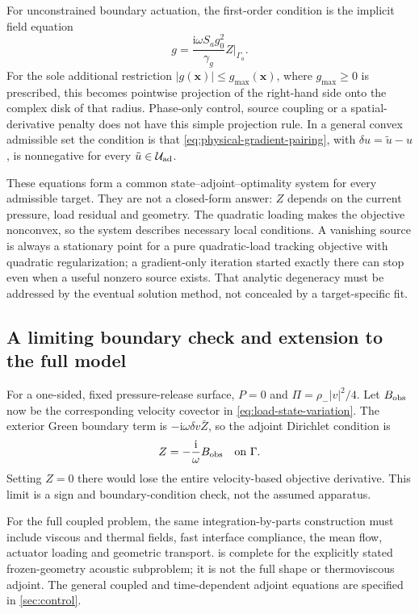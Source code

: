For unconstrained boundary actuation, the first-order condition is the
implicit field equation
\begin{equation}
 g=\frac{\mathrm i\omega S_ag_0^2}{\gamma_g}Z|_{\Gamma_a}.
 \label{eq:boundary-source-optimality}
\end{equation}
For the sole additional restriction $|g(\bm x)|\leq g_{\max}(\bm x)$,
where $g_{\max}\geq0$ is prescribed, this becomes pointwise projection of
the right-hand side onto the complex disk of that radius. Phase-only control,
source coupling or a spatial-derivative penalty does not have this simple
projection rule. In a general convex admissible set the condition is that
\cref{eq:physical-gradient-pairing}, with $\delta u=\tilde u-u$, is
nonnegative for every $\tilde u\in\mathcal U_{\rm ad}$.

These equations form a common state--adjoint--optimality system for every
admissible target. They are not a closed-form answer: $Z$ depends on the
current pressure, load residual and geometry. The quadratic loading makes
the objective nonconvex, so the system describes necessary local conditions.
A vanishing source is always a stationary point for a pure quadratic-load
tracking objective with quadratic regularization; a gradient-only iteration
started exactly there can stop even when a useful nonzero source exists.
That analytic degeneracy must be addressed by the eventual solution method,
not concealed by a target-specific fit.

\subsection{A limiting boundary check and extension to the full model}
For a one-sided, fixed pressure-release surface, $P=0$ and
$\Pi=\rho_-|v|^2/4$. Let $B_{\rm obs}$ now be the corresponding velocity
covector in \cref{eq:load-state-variation}. The exterior Green boundary term
is $-\mathrm i\omega\delta v\bar Z$, so the adjoint Dirichlet condition is
\begin{equation}
 Z=-\frac{\mathrm i}{\omega}B_{\rm obs}\quad\text{on }\Gamma.
 \label{eq:pressure-release-adjoint}
\end{equation}
Setting $Z=0$ there would lose the entire velocity-based objective derivative.
This limit is a sign and boundary-condition check, not the assumed apparatus.

For the full coupled problem, the same integration-by-parts construction must
include viscous and thermal fields, fast interface compliance, the mean flow,
actuator loading and geometric transport. 
is complete for the explicitly stated frozen-geometry acoustic subproblem;
it is not the full shape or thermoviscous adjoint. The general coupled and
time-dependent adjoint equations are specified in \cref{sec:control}.
